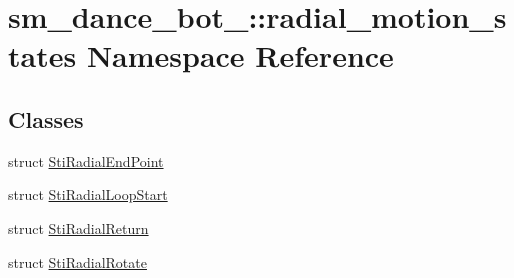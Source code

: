 \hypertarget{namespacesm__dance__bot__3_1_1radial__motion__states}{}\section{sm\+\_\+dance\+\_\+bot\+\_\+:\+:radial\+\_\+motion\+\_\+states Namespace Reference}
\label{namespacesm__dance__bot__3_1_1radial__motion__states}
\subsection*{Classes}
\begin{DoxyCompactItemize}
\item 
struct \hyperlink{structsm__dance__bot__3_1_1radial__motion__states_1_1StiRadialEndPoint}{Sti\+Radial\+End\+Point}
\item 
struct \hyperlink{structsm__dance__bot__3_1_1radial__motion__states_1_1StiRadialLoopStart}{Sti\+Radial\+Loop\+Start}
\item 
struct \hyperlink{structsm__dance__bot__3_1_1radial__motion__states_1_1StiRadialReturn}{Sti\+Radial\+Return}
\item 
struct \hyperlink{structsm__dance__bot__3_1_1radial__motion__states_1_1StiRadialRotate}{Sti\+Radial\+Rotate}
\end{DoxyCompactItemize}

